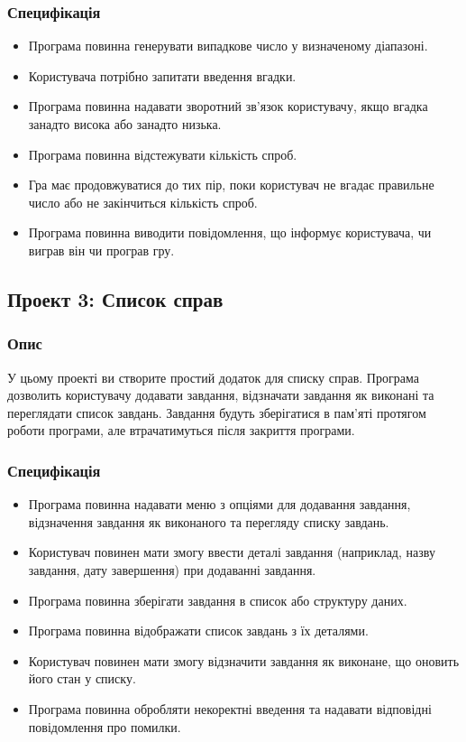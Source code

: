 \documentclass[12pt]{article}
\begin{document}
\subsubsection{Специфікація}
\begin{itemize}
\item Програма повинна генерувати випадкове число у визначеному діапазоні.
\item Користувача потрібно запитати введення вгадки.
\item Програма повинна надавати зворотний зв'язок користувачу, якщо вгадка занадто висока або занадто низька.
\item Програма повинна відстежувати кількість спроб.
\item Гра має продовжуватися до тих пір, поки користувач не вгадає правильне число або не закінчиться кількість спроб.
\item Програма повинна виводити повідомлення, що інформує користувача, чи виграв він чи програв гру.
\end{itemize}

\newpage
\subsection{Проект 3: Список справ}

\subsubsection{Опис}
У цьому проекті ви створите простий додаток для списку справ. Програма дозволить користувачу додавати завдання, відзначати завдання як виконані та переглядати список завдань. Завдання будуть зберігатися в пам'яті протягом роботи програми, але втрачатимуться після закриття програми.

\subsubsection{Специфікація}
\begin{itemize}
\item Програма повинна надавати меню з опціями для додавання завдання, відзначення завдання як виконаного та перегляду списку завдань.
\item Користувач повинен мати змогу ввести деталі завдання (наприклад, назву завдання, дату завершення) при додаванні завдання.
\item Програма повинна зберігати завдання в список або структуру даних.
\item Програма повинна відображати список завдань з їх деталями.
\item Користувач повинен мати змогу відзначити завдання як виконане, що оновить його стан у списку.
\item Програма повинна обробляти некоректні введення та надавати відповідні повідомлення про помилки.
\end{itemize}
\end{document}
